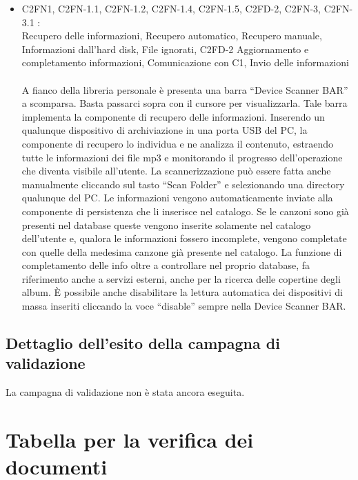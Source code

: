 \begin{itemize}
  \item C2FN1, C2FN-1.1, C2FN-1.2, C2FN-1.4, C2FN-1.5, C2FD-2, C2FN-3,
  C2FN-3.1 :\\
  Recupero delle informazioni, Recupero automatico, Recupero
  manuale, Informazioni dall'hard disk, File ignorati, C2FD-2 Aggiornamento e
  completamento informazioni, Comunicazione con C1, Invio delle informazioni\\
  \\A fianco della libreria personale \`e presenta una barra ``Device Scanner
  BAR'' a scomparsa. Basta passarci sopra con il cursore per visualizzarla. Tale
  barra implementa la componente di recupero delle informazioni. 
  Inserendo un qualunque dispositivo di archiviazione in una porta
  USB del PC, la componente di recupero lo individua e ne analizza il
  contenuto, estraendo tutte le informazioni dei file mp3 e monitorando il
  progresso dell'operazione che diventa visibile all'utente. La
  scannerizzazione pu\`o essere fatta anche manualmente cliccando sul tasto ``Scan Folder'' 
  e selezionando una directory qualunque del PC. Le informazioni vengono automaticamente inviate alla 
  componente di persistenza che li inserisce nel catalogo. Se le canzoni sono
  gi\`a presenti nel database queste vengono inserite solamente nel catalogo
  dell'utente e, qualora le informazioni fossero incomplete, vengono completate
  con quelle della medesima canzone gi\`a presente nel catalogo. La funzione di
  completamento delle info oltre a controllare nel proprio database, fa
  riferimento anche a servizi esterni, anche per la ricerca delle copertine
  degli album. \`E possibile anche disabilitare la lettura automatica dei
  dispositivi di massa inseriti cliccando la voce ``disable'' sempre nella Device Scanner BAR.
  
\end{itemize}


\section{Dettaglio dell'esito della campagna di validazione}
La campagna di validazione non \`e stata ancora eseguita.

\listoftables
{}
\listoffigures
{}



\appendix
\chapter{Tabella per la verifica dei documenti}

